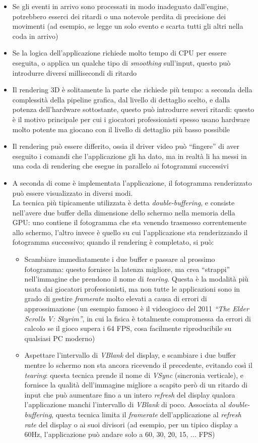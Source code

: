 \begin{itemize}
	\item Se gli eventi in arrivo sono processati in modo inadeguato dall'engine, potrebbero esserci dei ritardi o una notevole perdita di precisione dei movimenti (ad esempio, se legge un solo evento e scarta tutti gli altri nella coda in arrivo)
	\item Se la logica dell'applicazione richiede molto tempo di CPU per essere eseguita, o applica un qualche tipo di \textit{smoothing} sull'input, questo può introdurre diversi millisecondi di ritardo
	\item Il rendering 3D è solitamente la parte che richiede più tempo: a seconda della complessità della pipeline grafica, dal livello di dettaglio scelto, e dalla potenza dell'hardware sottostante, questo può introdurre severi ritardi: questo è il motivo principale per cui i giocatori professionisti spesso usano hardware molto potente ma giocano con il livello di dettaglio più basso possibile
	\item Il rendering può essere differito, ossia il driver video può ``fingere'' di aver eseguito i comandi che l'applicazione gli ha dato, ma in realtà li ha messi in una coda di rendering che esegue in parallelo ai fotogrammi successivi
	\item A seconda di come è implementata l'applicazione, il fotogramma renderizzato può essere visualizzato in diversi modi.\\
	La tecnica più tipicamente utilizzata è detta \textit{double-buffering}, e consiste nell'avere due buffer della dimensione dello schermo nella memoria della GPU: uno contiene il fotogramma che sta venendo trasmesso correntemente allo schermo, l'altro invece è quello su cui l'applicazione sta renderizzando il fotogramma successivo; quando il rendering è completato, si può:
	\begin{itemize}
		\item Scambiare immediatamente i due buffer e passare al prossimo fotogramma: questo fornisce la latenza migliore, ma crea ``strappi'' nell'immagine che prendono il nome di \textit{tearing}. Questa è la modalità più usata dai giocatori professionisti, ma non tutte le applicazioni sono in grado di gestire \textit{framerate} molto elevati a causa di errori di approssimazione (un esempio famoso è il videogioco del 2011 \textit{``The Elder Scrolls V: Skyrim''}, in cui la fisica è totalmente compromessa da errori di calcolo se il gioco supera i 64 FPS, cosa facilmente riproducibile su qualsiasi PC moderno)
		\item Aspettare l'intervallo di \textit{VBlank} del display, e scambiare i due buffer mentre lo schermo non sta ancora ricevendo il precedente, evitando così il \textit{tearing}: questa tecnica prende il nome di \textit{VSync} (sincronia verticale), e fornisce la qualità dell'immagine migliore a scapito però di un ritardo di input che può aumentare fino a un intero \textit{refresh} del display qualora l'applicazione manchi l'intervallo di \textit{VBlank} di poco. Associata al \textit{double-buffering}, questa tecnica limita il \textit{framerate} dell'applicazione al \textit{refresh rate} del display o ai suoi divisori (ad esempio, per un tipico display a 60Hz, l'applicazione può andare solo a 60, 30, 20, 15, ... FPS)

\end{itemize}
\end{itemize}
